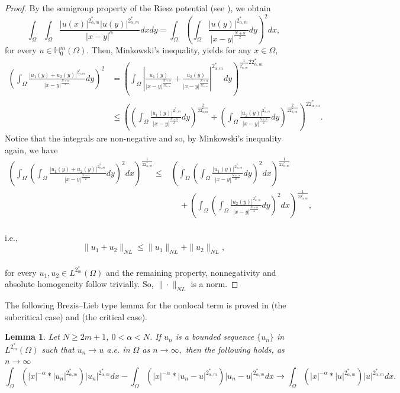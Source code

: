 \documentclass[reqno]{amsart}
\newtheorem{lemma}[theorem]{Lemma}
\newcommand{\Om}{\Omega}
\newcommand{\al} {\alpha}
\newcommand{\noi} {  \noindent}
\newcommand{\mb} {\mathbb}
\numberwithin{theorem}{section} \numberwithin{equation}{section}
\begin{document}
\begin{proof}
By the semigroup property of the Riesz potential (see \cite{28riesz1949integrale}), we obtain
\[\int_{\Om} \int_{\Om} \frac{|u(x)|^{2^*_{\al,m}}|u(y)|^{2^*_{\al,m}}}{|x-y|^\al} d x d y=\int_{\Om}\left(\int_{\Om} \frac{|u(y)|^{2^*_{\al,m}}}{|x-y|^{\frac{N +\al}{2}}} d y\right)^2 d x,\]
for every $u \in \mb{H}_0^m(\Om)$. Then, Minkowski's inequality, yields for any $x \in \Om$,
\begin{align*}
\left(\int_{\Om} \frac{|u_1(y)+u_2(y)|^{2^*_{\al,m}}}{|x-y|^{\frac{N+\al}{2}}} d y\right)^2 & =\left(\int_{\Om}\left|\frac{u_1(y)}{|x-y|^{\frac{N+\al}{22^*_{\al,m}}}}+\frac{u_2(y)}{|x-y|^{\frac{N+\al}{22^*_{\al,m}}}}\right|^{2^*_{\al,m}} d y\right)^{\frac{1}{2^*_{\al,m}}22^*_{\al,m}} \\
& \leq\left(\left(\int_{\Om} \frac{|u_1(y)|^{2^*_{\al,m}}}{|x-y|^{\frac{N+\al}{2}}} d y\right)^{ \frac{2}{22^*_{\al,m}}}+\left(\int_{\Om} \frac{|u_2(y)|^{2^*_{\al,m}}}{|x-y|^{\frac{N+\al}{2}}} d y\right)^{\frac{2}{22^*_{\al,m}}}\right)^{2 2^*_{\al,m}}.
\end{align*}
Notice that the integrals are non-negative and so, by Minkowski's inequality again, we have
\begin{align*}
\left(\int_{\Om}\left(\int_{\Om} \frac{|u_1(y)+u_2(y)|^{2^*_{\al,m}}}{|x-y|^{\frac{N+\al}{2}}} d y\right)^2 d x\right)^{\frac{1}{22^*_{\al,m}}}\leq&\left(\int_{\Om}\left(\int_{\Om} \frac{|u_1(y)|^{2^*_{\al,m}}}{|x-y|^{\frac{N+\al}{2}}} d y\right)^2 dx\right)^{\frac{1}{22^*_{\al,m}}}\\ & \quad +\left(\int_{\Om}\left(\int_{\Om} \frac{|u_2(y)|^{2^*_{\al,m}}}{|x-y|^{\frac{N+\al}{2}}} d y\right)^2 dx\right)^{\frac{1}{22^*_{\al,m}}},
\end{align*}\\
i.e.,
\[\|u_1 +u_2\|_{NL} \leq \|u_1\|_{NL} +\|u_2\|_{NL},\]\\
for every $u_1,u_2 \in L^{2^*_m}(\Om)$ and the remaining property, nonnegativity and absolute homogeneity follow trivially. So, $\|\cdot\|_{NL}$ is a norm. 
\end{proof} 
\noi The following Brezis--Lieb type lemma for the nonlocal term is proved in \cite{2ackermann2004periodic}(the subcritical case) and \cite{1gao2017nonlocal}(the critical case).
\begin{lemma}\label{l3}
Let $N\geq2m+1$, $0<\al<N$. If $u_n$ is a bounded sequence $\{u_n\}$ in $L^{2_m^*}(\Om)$ such that $u_n\to u$ a.e. in $\Om$ as $n \to\infty,$ then the following holds, as $n \to\infty$
\[\int_{\Om}(|x|^{-\al}*|u_n|^{2_{\al, m}^*})|u_n|^{2_{\al, m}^*} dx- \int_\Om(|x|^{-\al}*|u_n -u|^{2_{\al, m}^*})|u_n-u|^{2_{\al, m}^*} dx \to \int_\Om(|x|^{-\al}*|u|^{{2_{\al, m}^*}})|u|^{2_{\al, m}^*} dx.\]
\end{lemma}
\end{document}
